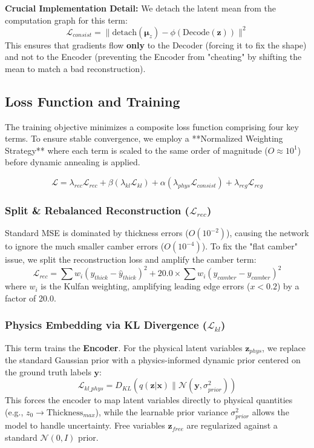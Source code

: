 \documentclass[11pt, a4paper]{article}
\begin{document}
\textbf{Crucial Implementation Detail:} We detach the latent mean from the computation graph for this term:
\begin{equation}
    \mathcal{L}_{consist} = \| \text{detach}(\mathbf{\mu}_{z}) - \phi(\text{Decode}(\mathbf{z})) \|^2
\end{equation}
This ensures that gradients flow \textbf{only} to the Decoder (forcing it to fix the shape) and not to the Encoder (preventing the Encoder from "cheating" by shifting the mean to match a bad reconstruction).

\subsection{Loss Function and Training}

The training objective minimizes a composite loss function comprising four key terms. To ensure stable convergence, we employ a **Normalized Weighting Strategy** where each term is scaled to the same order of magnitude ($O \approx 10^1$) before dynamic annealing is applied.

\begin{equation}
    \mathcal{L} = \lambda_{rec}\mathcal{L}_{rec} + \beta(\lambda_{kl}\mathcal{L}_{kl}) + \alpha(\lambda_{phys}\mathcal{L}_{consist}) + \lambda_{reg}\mathcal{L}_{reg}
\end{equation}

\subsubsection{Split \& Rebalanced Reconstruction ($\mathcal{L}_{rec}$)}
Standard MSE is dominated by thickness errors ($O(10^{-2})$), causing the network to ignore the much smaller camber errors ($O(10^{-4})$). To fix the "flat camber" issue, we split the reconstruction loss and amplify the camber term:
\begin{equation}
    \mathcal{L}_{rec} = \sum w_i (y_{thick} - \hat{y}_{thick})^2 + \mathbf{20.0} \times \sum w_i (y_{camber} - \hat{y}_{camber})^2
\end{equation}
where $w_i$ is the Kulfan weighting, amplifying leading edge errors ($x < 0.2$) by a factor of 20.0.

\subsubsection{Physics Embedding via KL Divergence ($\mathcal{L}_{kl}$)}
This term trains the \textbf{Encoder}. For the physical latent variables $\mathbf{z}_{phys}$, we replace the standard Gaussian prior with a physics-informed dynamic prior centered on the ground truth labels $\mathbf{y}$:
\begin{equation}
    \mathcal{L}_{kl\_phys} = D_{KL}\left( q(\mathbf{z}|\mathbf{x}) \parallel \mathcal{N}(\mathbf{y}, \sigma_{prior}^2) \right)
\end{equation}
This forces the encoder to map latent variables directly to physical quantities (e.g., $z_0 \to \text{Thickness}_{max}$), while the learnable prior variance $\sigma_{prior}^2$ allows the model to handle uncertainty. Free variables $\mathbf{z}_{free}$ are regularized against a standard $\mathcal{N}(0, I)$ prior.
\end{document}
